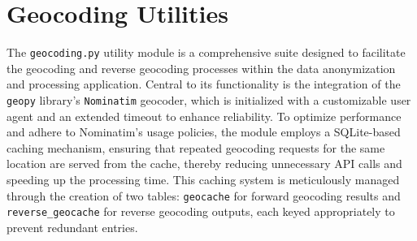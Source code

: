 \documentclass{article}
\begin{document}
\section*{Geocoding Utilities}
The \texttt{geocoding.py} utility module is a comprehensive suite designed to facilitate the geocoding and reverse geocoding processes within the data anonymization and processing application. Central to its functionality is the integration of the \texttt{geopy} library's \texttt{Nominatim} geocoder, which is initialized with a customizable user agent and an extended timeout to enhance reliability. To optimize performance and adhere to Nominatim's usage policies, the module employs a SQLite-based caching mechanism, ensuring that repeated geocoding requests for the same location are served from the cache, thereby reducing unnecessary API calls and speeding up the processing time. This caching system is meticulously managed through the creation of two tables: \texttt{geocache} for forward geocoding results and \texttt{reverse\_geocache} for reverse geocoding outputs, each keyed appropriately to prevent redundant entries.
\end{document}
